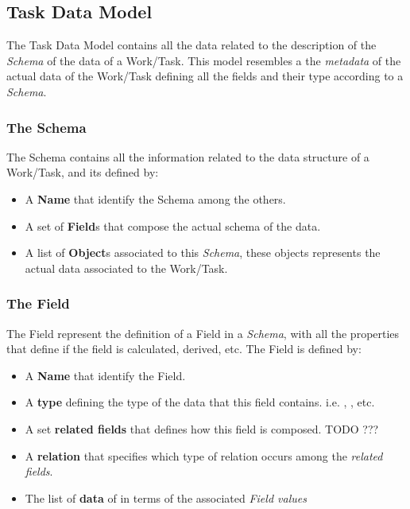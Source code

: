 \subsection{Task Data Model}
The Task Data Model contains all the data related to the description of the
\emph{Schema} of the data of a Work/Task. This model resembles a the
\emph{metadata} of the actual data of the Work/Task defining all the fields
and their type according to a \emph{Schema}.


\subsubsection{The Schema}
The Schema contains all the information related to the data structure of a
Work/Task, and its defined by:
\begin{itemize}
    \item A \textbf{Name} that identify the Schema among the others.

    \item A set of \textbf{Field}s that compose the actual schema of the data. 
    
    \item A list of \textbf{Object}s associated to this \emph{Schema}, these
    objects represents the actual data associated to the Work/Task.
\end{itemize}



\subsubsection{The Field}
The Field represent the definition of a Field in a \emph{Schema}, with all the
properties that define if the field is calculated, derived, etc. The Field is
defined by:
\begin{itemize}
    \item A \textbf{Name} that identify the Field.
    
    \item A \textbf{type} defining the type of the data that this field contains.
    i.e. , , etc.

    \item A set \textbf{related fields} that defines how this field is composed.
    TODO ???
    
    \item A \textbf{relation} that specifies which type of relation occurs among
    the \emph{related fields}.

    \item The list of \textbf{data} of in terms of the associated \emph{Field
    values}
\end{itemize}





